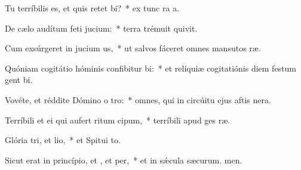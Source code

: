 \item Tu terríbilis es, et quis retet bi?~* ex tunc ra a.
\item De cælo audítum feti jucium:~* terra trémuit  quivit.
\item Cum exsúrgeret in jucium us,~* ut salvos fáceret omnes mansutos ræ.
\item Quóniam cogitátio hóminis confibitur bi:~* et relíquiæ cogitatiónis diem festum gent bi.
\item Vovéte, et réddite Dómino o tro:~* omnes, qui in circúitu ejus aftis nera.
\item Terríbili et ei qui aufert ritum cipum,~* terríbili apud ges ræ.
\item Glória tri, et lio,~* et Spitui to.
\item Sicut erat in princípio, et , et per,~* et in sǽcula sæcurum. men.
